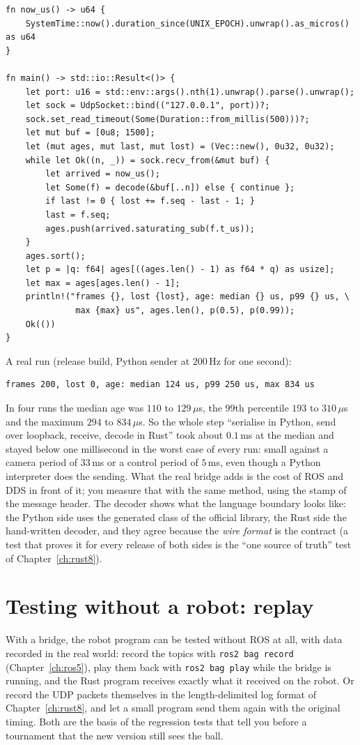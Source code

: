 \begin{verbatim}
fn now_us() -> u64 {
    SystemTime::now().duration_since(UNIX_EPOCH).unwrap().as_micros() as u64
}

fn main() -> std::io::Result<()> {
    let port: u16 = std::env::args().nth(1).unwrap().parse().unwrap();
    let sock = UdpSocket::bind(("127.0.0.1", port))?;
    sock.set_read_timeout(Some(Duration::from_millis(500)))?;
    let mut buf = [0u8; 1500];
    let (mut ages, mut last, mut lost) = (Vec::new(), 0u32, 0u32);
    while let Ok((n, _)) = sock.recv_from(&mut buf) {
        let arrived = now_us();
        let Some(f) = decode(&buf[..n]) else { continue };
        if last != 0 { lost += f.seq - last - 1; }
        last = f.seq;
        ages.push(arrived.saturating_sub(f.t_us));
    }
    ages.sort();
    let p = |q: f64| ages[((ages.len() - 1) as f64 * q) as usize];
    let max = ages[ages.len() - 1];
    println!("frames {}, lost {lost}, age: median {} us, p99 {} us, \
              max {max} us", ages.len(), p(0.5), p(0.99));
    Ok(())
}
\end{verbatim}
A real run (release build, Python sender at $200$\,Hz for one second):
\begin{verbatim}
frames 200, lost 0, age: median 124 us, p99 250 us, max 834 us
\end{verbatim}
In four runs the median age was $110$ to $129\,\mu$s, the $99$th percentile $193$ to $310\,\mu$s and the maximum $294$ to $834\,\mu$s. So the whole step ``serialise in Python, send over loopback, receive, decode in Rust'' took about $0.1$\,ms at the median and stayed below one millisecond in the worst case of every run: small against a camera period of $33$\,ms or a control period of $5$\,ms, even though a Python interpreter does the sending. What the real bridge adds is the cost of ROS and DDS in front of it; you measure that with the same method, using the stamp of the message header. The decoder shows what the language boundary looks like: the Python side uses the generated class of the official library, the Rust side the hand-written decoder, and they agree because the \emph{wire format} is the contract (a test that proves it for every release of both sides is the ``one source of truth'' test of Chapter~\ref{ch:rust8}).

\section*{Testing without a robot: replay}
With a bridge, the robot program can be tested without ROS at all, with data recorded in the real world: record the topics with \verb!ros2 bag record! (Chapter~\ref{ch:ros5}), play them back with \verb!ros2 bag play! while the bridge is running, and the Rust program receives exactly what it received on the robot. Or record the UDP packets themselves in the length-delimited log format of Chapter~\ref{ch:rust8}, and let a small program send them again with the original timing. Both are the basis of the regression tests that tell you before a tournament that the new version still sees the ball.

